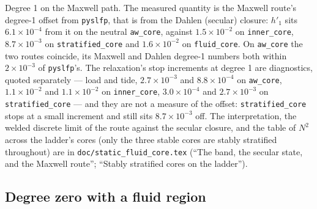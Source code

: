 \documentclass[11pt]{article}
\numberwithin{equation}{section}
\newcommand{\code}[1]{\texttt{#1}}
\begin{document}
Degree 1 on the Maxwell path. The measured quantity is the Maxwell
route's degree-1 offset from \code{pyslfp}, that is from the Dahlen
(secular) closure: $h'_1$ sits $6.1\times10^{-4}$ from it on the neutral
\code{aw\_core}, against $1.5\times10^{-2}$ on \code{inner\_core},
$8.7\times10^{-3}$ on \code{stratified\_core} and $1.6\times10^{-2}$ on
\code{fluid\_core}. On \code{aw\_core} the two routes coincide, its Maxwell
and Dahlen degree-1 numbers both within $2\times10^{-3}$ of
\code{pyslfp}'s. The relaxation's stop increments at degree 1 are
diagnostics, quoted separately --- load and tide, $2.7\times10^{-3}$ and
$8.8\times10^{-4}$ on \code{aw\_core}, $1.1\times10^{-2}$ and
$1.1\times10^{-2}$ on \code{inner\_core}, $3.0\times10^{-4}$ and
$2.7\times10^{-3}$ on \code{stratified\_core} --- and they are not a
measure of the offset: \code{stratified\_core} stops at a small increment
and still sits $8.7\times10^{-3}$ off. The interpretation, the welded
discrete limit of the route against the secular closure, and the table of
$N^2$ across the ladder's cores (only the three stable cores are stably
stratified throughout) are in
\code{doc/static\_fluid\_core.tex} (``The band, the secular state, and the
Maxwell route''; ``Stably stratified cores on the ladder'').

\subsection{Degree zero with a fluid region}
\label{sec:e2-degree0}
\end{document}
